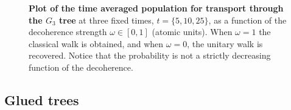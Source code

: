 \documentclass[11pt,oneside,final]{huthesis}%
\begin{document}
\begin{figure}
	\begin{center}
	\end{center}
	\caption{\textbf{Plot of the time averaged population for transport through the $G_3$ tree} at three fixed times, $t=\{5,10,25\}$, as a function of the decoherence strength $\omega\in[0,1]$ (atomic units).  When $\omega=1$ the classical walk is obtained, and when $\omega=0$, the unitary walk is recovered. Notice that the probability is not a strictly decreasing function of the decoherence.}\label{fig:cross}
\end{figure}


\subsection{Glued trees}
\end{document}
